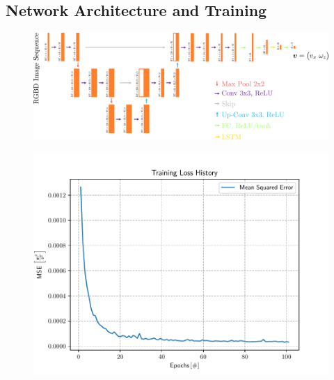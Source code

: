 \subsection{Network Architecture and Training}
\begin{figure}[h]
	\centering
	\includegraphics[scale=.5]{chapters/05_experiments/02_autonomous_walking/unet.png}
	\caption{}
	\label{fig::524_unet}
\end{figure}
\begin{figure}[h]
	\centering
	\includegraphics[scale=.6]{chapters/05_experiments/02_autonomous_walking/05_07_19_loss_history.pdf}
	\caption{}
	\label{fig::524_loss}
\end{figure}
